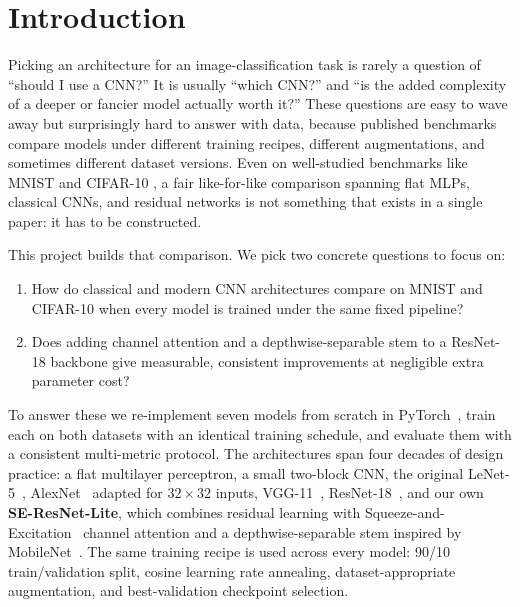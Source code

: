 \documentclass[conference,10pt]{IEEEtran}
\begin{document}
\section{Introduction}
\label{sec:intro}

Picking an architecture for an image-classification task is rarely a
question of ``should I use a CNN?'' It is usually ``which CNN?''
and ``is the added complexity of a deeper or fancier model actually
worth it?'' These questions are easy to wave away but surprisingly
hard to answer with data, because published benchmarks compare models
under different training recipes, different augmentations, and
sometimes different dataset versions. Even on well-studied benchmarks
like MNIST \cite{lecun1998gradient} and CIFAR-10
\cite{krizhevsky2009learning}, a fair like-for-like comparison
spanning flat MLPs, classical CNNs, and residual networks is not
something that exists in a single paper: it has to be constructed.

This project builds that comparison. We pick two concrete questions
to focus on:
\begin{enumerate}
  \item How do classical and modern CNN architectures compare on
    MNIST and CIFAR-10 when every model is trained under the same
    fixed pipeline?
  \item Does adding channel attention and a depthwise-separable stem
    to a ResNet-18 backbone give measurable, consistent improvements
    at negligible extra parameter cost?
\end{enumerate}

To answer these we re-implement seven models from scratch in
PyTorch~\cite{paszke2019pytorch}, train each on both datasets with an
identical training schedule, and evaluate them with a consistent
multi-metric protocol. The architectures span four decades of design
practice: a flat multilayer perceptron, a small two-block CNN, the
original LeNet-5~\cite{lecun1998gradient},
AlexNet~\cite{krizhevsky2012imagenet} adapted for $32\!\times\!32$
inputs, VGG-11~\cite{simonyan2015very}, ResNet-18~\cite{he2016deep},
and our own \textbf{SE-ResNet-Lite}, which combines residual learning
with Squeeze-and-Excitation~\cite{hu2018squeeze} channel attention and
a depthwise-separable stem inspired by
MobileNet~\cite{howard2017mobilenets}. The same training recipe is
used across every model: 90/10 train/validation split, cosine learning
rate annealing, dataset-appropriate augmentation, and best-validation
checkpoint selection.
\end{document}

